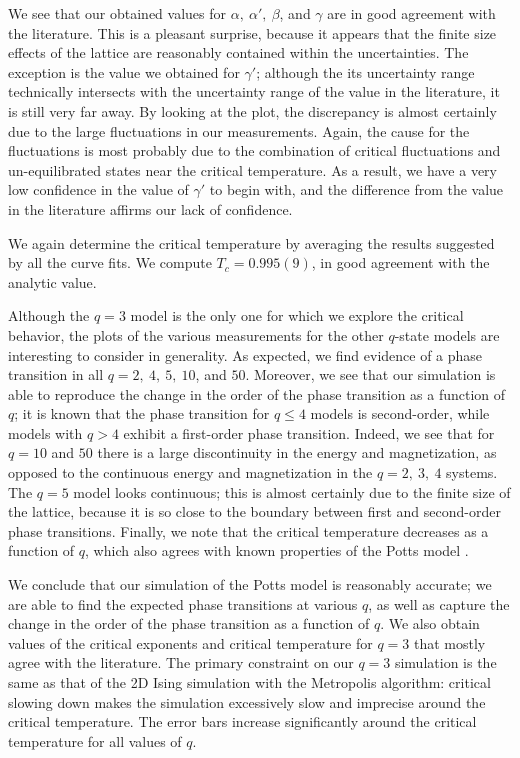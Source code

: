 \documentclass[twocolumn,aps]{revtex4-1} %
\begin{document}
We see that our obtained values for $\alpha,\ \alpha',\ \beta$, and $\gamma$ are in good agreement with the literature. This is a pleasant surprise, because it appears that the finite size effects of the lattice are reasonably contained within the uncertainties. The exception is the value we obtained for $\gamma'$; although the its uncertainty range technically intersects with the uncertainty range of the value in the literature, it is still very far away. By looking at the plot, the discrepancy is almost certainly due to the large fluctuations in our measurements. Again, the cause for the fluctuations is most probably due to the combination of critical fluctuations and un-equilibrated states near the critical temperature. As a result, we have a very low confidence in the value of $\gamma'$ to begin with, and the difference from the value in the literature affirms our lack of confidence.

We again determine the critical temperature by averaging the results suggested by all the curve fits. We compute $T_c = 0.995(9)$, in good agreement with the analytic value.

Although the $q = 3$ model is the only one for which we explore the critical behavior, the plots of the various measurements for the other $q$-state models are interesting to consider in generality. As expected, we find evidence of a phase transition in all $q = 2,\ 4,\ 5,\ 10$, and $50$. Moreover, we see that our simulation is able to reproduce the change in the order of the phase transition as a function of $q$; it is known that the phase transition for $q \leq 4$ models is second-order, while models with $q > 4$ exhibit a first-order phase transition. Indeed, we see that for $q = 10$ and $50$ there is a large discontinuity in the energy and magnetization, as opposed to the continuous energy and magnetization in the $q = 2,\ 3,\ 4$ systems. The $q = 5$ model looks continuous; this is almost certainly due to the finite size of the lattice, because it is so close to the boundary between first and second-order phase transitions. Finally, we note that the critical temperature decreases as a function of $q$, which also agrees with known properties of the Potts model \cite{potts}.

We conclude that our simulation of the Potts model is reasonably accurate; we are able to find the expected phase transitions at various $q$, as well as capture the change in the order of the phase transition as a function of $q$. We also obtain values of the critical exponents and critical temperature for $q = 3$ that mostly agree with the literature. The primary constraint on our $q = 3$ simulation is the same as that of the 2D Ising simulation with the Metropolis algorithm: critical slowing down makes the simulation excessively slow and imprecise around the critical temperature. The error bars increase significantly around the critical temperature for all values of $q$.
\end{document}
